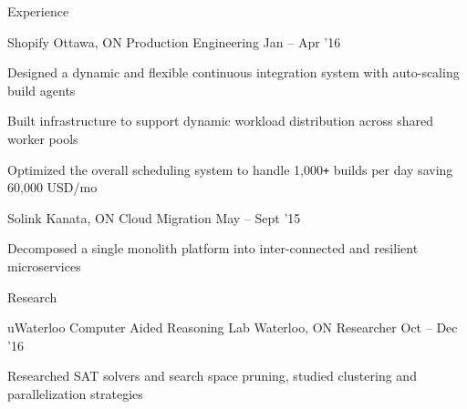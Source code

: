 \documentclass{resume} %
\begin{document}
\begin{rSection}{Experience}
  \begin{rSubsection}{Shopify}
                     {Ottawa, ON}
                     {Production Engineering}
                     {Jan -- Apr '16}

  \item Designed a dynamic and flexible continuous integration system with
    auto-scaling build agents
  \item Built infrastructure to support dynamic workload distribution across
    shared worker pools
  \item Optimized the overall scheduling system to handle 1,000\texttt{+} builds per
    day saving 60,000 USD/mo
  \end{rSubsection}

  \begin{rSubsection}{Solink}
                     {Kanata, ON}
                     {Cloud Migration}
                     {May -- Sept '15}

   \item Decomposed a single monolith platform into inter-connected and
      resilient microservices
  \end{rSubsection}
\end{rSection}


\begin{rSection}{Research}
  \begin{rSubsection}{uWaterloo Computer Aided Reasoning Lab}
                     {Waterloo, ON}
                     {Researcher}
                     {Oct -- Dec '16}
   \item Researched SAT solvers and search space pruning, studied clustering and
     parallelization strategies
  \end{rSubsection}
\end{rSection}

\end{document}
